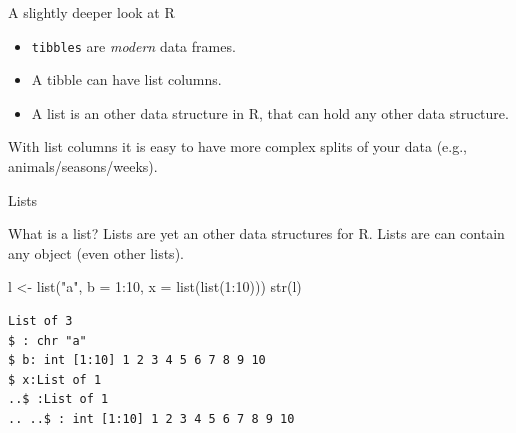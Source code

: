 \documentclass[ignorenonframetext,,t]{beamer}
\providecommand{\tightlist}{%
\setlength{\itemsep}{0pt}\setlength{\parskip}{0pt}}
\newenvironment{Shaded}{\begin{snugshade}}{\end{snugshade}}
\newcommand{\AttributeTok}[1]{\textcolor[rgb]{0.77,0.63,0.00}{#1}}
\newcommand{\DecValTok}[1]{\textcolor[rgb]{0.00,0.00,0.81}{#1}}
\newcommand{\FunctionTok}[1]{\textcolor[rgb]{0.00,0.00,0.00}{#1}}
\newcommand{\NormalTok}[1]{#1}
\newcommand{\OtherTok}[1]{\textcolor[rgb]{0.56,0.35,0.01}{#1}}
\newcommand{\SpecialCharTok}[1]{\textcolor[rgb]{0.00,0.00,0.00}{#1}}
\newcommand{\StringTok}[1]{\textcolor[rgb]{0.31,0.60,0.02}{#1}}
\providecommand{\tightlist}{%
\setlength{\itemsep}{0pt}\setlength{\parskip}{0pt}}
\renewcommand{\tightlist}{\setlength{\itemsep}{1.4ex}\setlength{\parskip}{0pt}}
\begin{document}
\begin{frame}[fragile]
\begin{block}{A slightly deeper look at R}
\protect\hypertarget{a-slightly-deeper-look-at-r}{}
\begin{itemize}
\tightlist
\item
  \texttt{tibbles} are \emph{modern} data frames.
\item
  A tibble can have list columns.
\item
  A list is an other data structure in R, that can hold any other data
  structure.
\end{itemize}

With list columns it is easy to have more complex splits of your data
(e.g., animals/seasons/weeks).
\end{block}
\end{frame}

\begin{frame}[fragile]{Lists}
\protect\hypertarget{lists}{}
\begin{block}{What is a list?}
\protect\hypertarget{what-is-a-list}{}
Lists are yet an other data structures for R. Lists are can contain any
object (even other lists).

\begin{Shaded}
\begin{Highlighting}[]
\NormalTok{l }\OtherTok{\textless{}{-}} \FunctionTok{list}\NormalTok{(}\StringTok{"a"}\NormalTok{, }\AttributeTok{b =} \DecValTok{1}\SpecialCharTok{:}\DecValTok{10}\NormalTok{, }\AttributeTok{x =} \FunctionTok{list}\NormalTok{(}\FunctionTok{list}\NormalTok{(}\DecValTok{1}\SpecialCharTok{:}\DecValTok{10}\NormalTok{)))}
\FunctionTok{str}\NormalTok{(l)}
\end{Highlighting}
\end{Shaded}

\begin{verbatim}
List of 3
$ : chr "a"
$ b: int [1:10] 1 2 3 4 5 6 7 8 9 10
$ x:List of 1
..$ :List of 1
.. ..$ : int [1:10] 1 2 3 4 5 6 7 8 9 10
\end{verbatim}
\end{block}
\end{frame}
\end{document}
